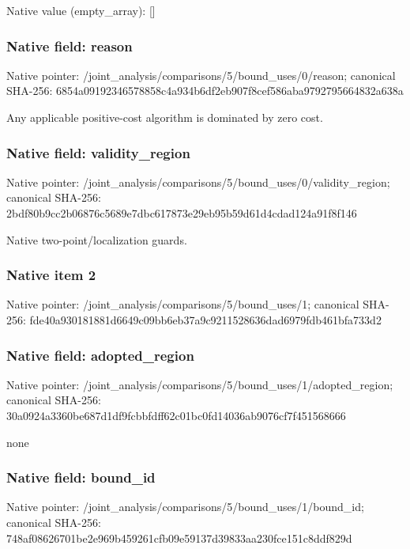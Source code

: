 \documentclass[10pt,a4paper]{article}
\begin{document}
Native value (empty\_\allowbreak{}array): []

\subsubsection{Native field: reason}
Native pointer: /joint\_\allowbreak{}analysis/comparisons/5/bound\_\allowbreak{}uses/0/reason; canonical SHA-256: 6854a09192346578858c4a934b6df2eb907f8cef586aba9792795664832a638a

\begingroup\raggedright\sloppy Any applicable positive-cost algorithm is dominated by zero cost.\par\endgroup

\subsubsection{Native field: validity\_\allowbreak{}region}
Native pointer: /joint\_\allowbreak{}analysis/comparisons/5/bound\_\allowbreak{}uses/0/validity\_\allowbreak{}region; canonical SHA-256: 2bdf80b9cc2b06876c5689e7dbc617873e29eb95b59d61d4cdad124a91f8f146

\begingroup\raggedright\sloppy Native two-point/\allowbreak{}localization guards.\par\endgroup

\subsubsection{Native item 2}
Native pointer: /joint\_\allowbreak{}analysis/comparisons/5/bound\_\allowbreak{}uses/1; canonical SHA-256: fde40a930181881d6649c09bb6eb37a9c9211528636dad6979fdb461bfa733d2

\subsubsection{Native field: adopted\_\allowbreak{}region}
Native pointer: /joint\_\allowbreak{}analysis/comparisons/5/bound\_\allowbreak{}uses/1/adopted\_\allowbreak{}region; canonical SHA-256: 30a0924a3360be687d1df9fcbbfdff62c01bc0fd14036ab9076cf7f451568666

\begingroup\raggedright\sloppy none\par\endgroup

\subsubsection{Native field: bound\_\allowbreak{}id}
Native pointer: /joint\_\allowbreak{}analysis/comparisons/5/bound\_\allowbreak{}uses/1/bound\_\allowbreak{}id; canonical SHA-256: 748af08626701be2e969b459261cfb09e59137d39833aa230fce151c8ddf829d
\end{document}
